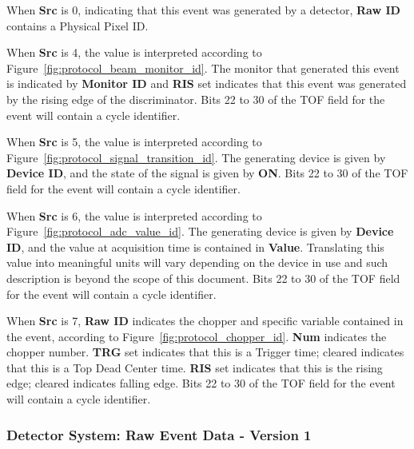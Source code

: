 When {\bf Src} is 0, indicating that this event was generated by a detector,
{\bf Raw ID} contains a Physical Pixel ID.

When {\bf Src} is 4, the value is interpreted according to
Figure~\ref{fig:protocol_beam_monitor_id}. The monitor that generated this
event is indicated by {\bf Monitor ID} and {\bf RIS} set indicates that this
event was generated by the rising edge of the discriminator. Bits 22 to 30 of
the TOF field for the event will contain a cycle identifier.

When {\bf Src} is 5, the value is interpreted according to
Figure~\ref{fig:protocol_signal_transition_id}. The generating device is given
by {\bf Device ID}, and the state of the signal is given by {\bf ON}. Bits 22
to 30 of the TOF field for the event will contain a cycle identifier.

When {\bf Src} is 6, the value is interpreted according to
Figure~\ref{fig:protocol_adc_value_id}. The generating device is given by {\bf
Device ID}, and the value at acquisition time is contained in {\bf Value}.
Translating this value into meaningful units will vary depending on the device
in use and such description is beyond the scope of this document.  Bits 22 to
30 of the TOF field for the event will contain a cycle identifier.

When {\bf Src} is 7, {\bf Raw ID} indicates the chopper and specific variable
contained in the event, according to Figure~\ref{fig:protocol_chopper_id}.
{\bf Num} indicates the chopper number. {\bf TRG} set indicates that this is a
Trigger time; cleared indicates that this is a Top Dead Center time. {\bf RIS}
set indicates that this is the rising edge; cleared indicates falling edge.
Bits 22 to 30 of the TOF field for the event will contain a cycle identifier.



\newpage
\subsubsection{Detector System: Raw Event Data - Version 1}
\label{section:protocol_raw_event_packet_v1}

